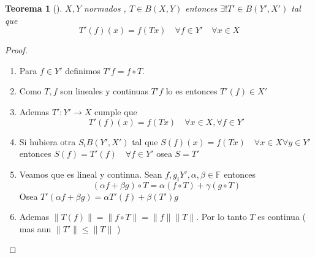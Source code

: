 \documentclass[10pt]{extarticle}
\theoremstyle{break}
\newtheorem{theorem}{Teorema}[section]
\theoremstyle{definition}
\begin{document}
\begin{theorem}[] \label{13.1} 
	$ X,Y $ normados , $ T \in B( X,Y ) $ entonces $ \exists !T'\in B( Y',X' )$ tal que $$ T'( f ) ( x ) =f( Tx ) \quad\forall f\in Y'\quad\forall x\in X$$ 
\end{theorem}
\begin{proof}
	\begin{enumerate}
		\item Para $ f\in Y' $ definimos $ T'f=f\circ T $. 
		\item Como $ T,f $ son lineales y continuas $ T'f $ lo es entonces  $ T'( f)\in X'  $ 
		\item Ademas $ T':Y'\longrightarrow X  $ cumple que 
			$$T'( f)( x)=f( Tx)\quad\forall x\in X ,\forall f\in Y'$$ 
		\item Si hubiera otra $ S_{i} B( Y',X' )  $ tal que $ S( f)( x)=f( Tx) \quad\forall x\in X \forall y\in Y' $ entonces $ S( f)=T'( f)\quad\forall f\in Y'  $ osea $ S=T' $ 
		\item Veamos que es lineal y continua. Sean $ f,g_{i} Y',\alpha, \beta\in\mathbb{F} $ entonces $$  ( \alpha f+\beta g)\circ T=\alpha ( f\circ T)+\gamma( g\circ T)$$
			Osea $ T'( \alpha f+\beta g)=\alpha T'( f)+\beta( T')g $ 
		\item Ademas $ \lVert T( f) \rVert =\lVert f\circ T \rVert =\lVert f \rVert \lVert T \rVert  $. Por lo tanto $T $ es continua ( mas aun $ \lVert T' \rVert \leq \lVert T \rVert  $\label{des} )
	\end{enumerate}
\end{proof}
\end{document}
